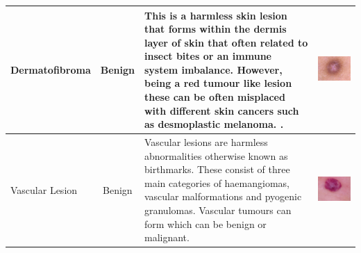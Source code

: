 {\begin{tabular}{|m{3cm}|c|m{15cm}|m{3cm}|}
	\\
	\hline
	Dermatofibroma & Benign & 
	This is a harmless skin lesion that forms within the dermis layer of skin that often related to insect bites or an immune system imbalance. However, being a red tumour like lesion these can be often misplaced with different skin cancers such as desmoplastic melanoma. \cite{Chen2013}. & 
	\includegraphics[scale=0.15]{images/intro/figure-2-fibro.jpg} 
	\\
	\hline
	Vascular Lesion & Benign & 
	Vascular lesions are harmless abnormalities otherwise known as birthmarks. These consist of three main categories of haemangiomas, vascular malformations and pyogenic granulomas. Vascular tumours can form which can be benign or malignant. & 
	\includegraphics[scale=0.15]{images/intro/figure-2-vasc.jpg} 

\end{tabular}}
